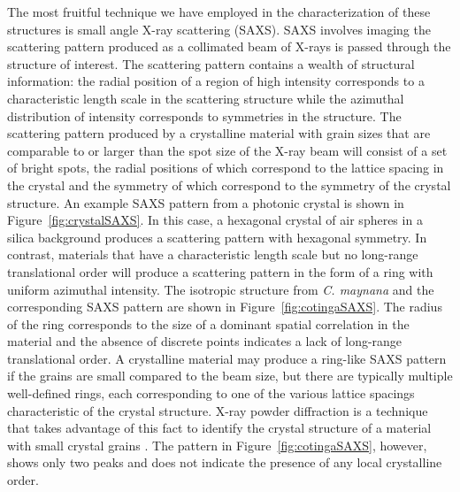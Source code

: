 The most fruitful technique we have employed in the characterization of these structures is small angle X-ray scattering (SAXS).
SAXS involves imaging the scattering pattern produced as a collimated beam of X-rays is passed through the structure of interest.
The scattering pattern contains a wealth of structural information: the radial position of a region of high intensity corresponds to a characteristic length scale in the scattering structure while the azimuthal distribution of intensity corresponds to symmetries in the structure.
The scattering pattern produced by a crystalline material with grain sizes that are comparable to or larger than the spot size of the X-ray beam will consist of a set of bright spots, the radial positions of which correspond to the lattice spacing in the crystal and the symmetry of which correspond to the symmetry of the crystal structure.
An example SAXS pattern from a photonic crystal is shown in Figure~\ref{fig:crystalSAXS}.
In this case, a hexagonal crystal of air spheres in a silica background produces a scattering pattern with hexagonal symmetry.
In contrast, materials that have a characteristic length scale but no long-range translational order will produce a scattering pattern in the form of a ring with uniform azimuthal intensity.
The isotropic structure from \emph{C. maynana} and the corresponding SAXS pattern are shown in Figure~\ref{fig:cotingaSAXS}.
The radius of the ring corresponds to the size of a dominant spatial correlation in the material and the absence of discrete points indicates a lack of long-range translational order.
A crystalline material may produce a ring-like SAXS pattern if the grains are small compared to the beam size, but there are typically multiple well-defined rings, each corresponding to one of the various lattice spacings characteristic of the crystal structure.
X-ray powder diffraction is a technique that takes advantage of this fact to identify the crystal structure of a material with small crystal grains \cite{Pecharsky:2003}.
The pattern in Figure~\ref{fig:cotingaSAXS}, however, shows only two peaks and does not indicate the presence of any local crystalline order.

